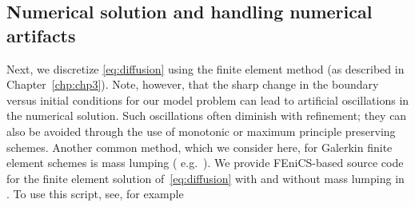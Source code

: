\subsection{Numerical solution and handling numerical artifacts}
Next, we discretize \eqref{eq:diffusion} using the finite element
method (as described in Chapter~\ref{chp:chp3}). Note, however, that the
sharp change in the boundary versus initial conditions for our model
problem can lead to artificial oscillations in the numerical
solution. Such oscillations often diminish with refinement; they can
also be avoided through the use of monotonic or maximum principle
preserving schemes. Another common method, which we consider here, for
Galerkin finite element schemes is mass lumping (%
e.g.~\cite{langtangen2016solving}). We provide FEniCS-based source
code for the finite element solution of~\eqref{eq:diffusion} with and
without mass lumping in . To use
this script, see, for example 
